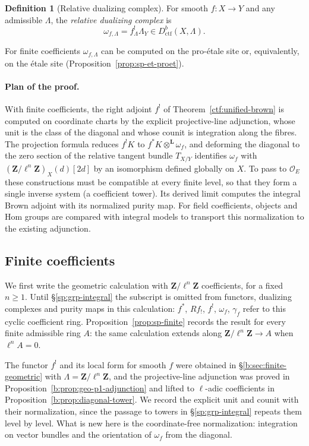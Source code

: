 \documentclass[11pt,a4paper]{article}
\numberwithin{equation}{section}
\theoremstyle{definition}
\newtheorem{definition}[theorem]{Definition}
\theoremstyle{remark}
\newcommand{\Dctf}{D^b_{\mathrm{ctf}}}
\begin{document}
\begin{definition}[Relative dualizing complex]\label{def:sp-dualizing}
For smooth $f:X\to Y$ and any admissible $\Lambda$, the
\emph{relative dualizing complex} is
\begin{equation}\label{eq:sp-omega}
 \omega_{f,\Lambda}=f_\Lambda^{!}\Lambda_Y
       \in\Dctf(X,\Lambda).
\end{equation}
\end{definition}

For finite coefficients $\omega_{f,\Lambda}$ can be computed on the
pro-\'etale site or, equivalently, on the \'etale site
(Proposition~\ref{prop:sp-et-proet}).

\paragraph*{Plan of the proof.}
With finite coefficients, the right adjoint $f^!$ of Theorem~\ref{ctf:unified-brown} is computed
on coordinate charts by the explicit projective-line adjunction, whose unit
is the class of the diagonal and whose counit is integration along the
fibres. The projection formula reduces $f^!K$ to
$f^*K\otimes^{\mathbf L}\omega_f$, and deforming the diagonal to the
zero section of the relative tangent bundle $T_{X/Y}$ identifies
$\omega_f$ with $(\mathbf Z/\ell^n\mathbf Z)_X(d)[2d]$ by an isomorphism
defined globally on $X$. To pass to $\mathcal O_E$ these constructions must be compatible at
every finite level, so that they form a single inverse system (a
coefficient tower). Its derived limit computes the integral Brown
adjoint with its normalized purity map. For field coefficients, objects
and Hom groups are compared with integral models to transport this
normalization to the existing adjunction.

\subsection{Finite coefficients}
\label{sp:grp-finite}
We first write the geometric calculation with
$\mathbf Z/\ell^n\mathbf Z$ coefficients, for a fixed $n\geq1$.
Until \S\ref{sp:grp-integral} the subscript is omitted from functors,
dualizing complexes and purity maps in this calculation:
$f^*$, $Rf_!$, $f^!$, $\omega_f$, $\gamma_f$ refer to this cyclic
coefficient ring. Proposition~\ref{prop:sp-finite} records the result
for every finite admissible ring $A$: the same calculation extends
along $\mathbf Z/\ell^n\mathbf Z\to A$ when $\ell^nA=0$.

The functor $f^!$ and its local form for smooth $f$ were obtained in
\S\ref{b:sec:finite-geometric} with $\Lambda=\mathbf Z/\ell^n\mathbf Z$,
and the projective-line adjunction was proved in
Proposition~\ref{b:prop:geo-p1-adjunction} and lifted to $\ell$-adic
coefficients in Proposition~\ref{b:prop:diagonal-tower}. We record the
explicit unit and counit with their normalization, since the passage to
towers in \S\ref{sp:grp-integral} repeats them level by level. What is
new here is the coordinate-free normalization: integration on vector
bundles and the orientation of $\omega_f$ from the diagonal.
\end{document}
